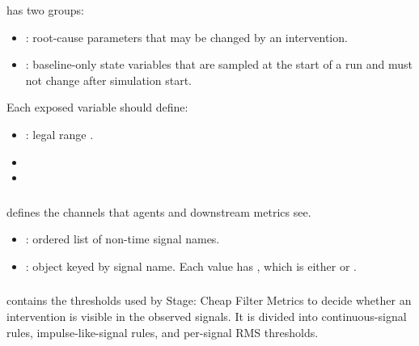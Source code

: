 \documentclass[11pt]{article}
\begin{document}
 has two groups:

\begin{itemize}
\item {}: root-cause parameters that may be changed by an intervention.
\item {}: baseline-only state variables that are sampled at the start of a run and must not change after simulation start.
\end{itemize}

Each exposed variable should define:

\begin{itemize}
\item {}: legal range .
\item \termMinSRDDistance
\item \termMinAbsDist
\end{itemize}

\subsubsection*{}

 defines the channels that agents and downstream metrics see.

\begin{itemize}
\item {}: ordered list of non-time signal names.
\item {}: object keyed by signal name. Each value has , which is either  or .
\end{itemize}

\subsubsection*{}

 contains the thresholds used by Stage: Cheap Filter Metrics to decide whether an intervention is visible in the observed signals.
It is divided into continuous-signal rules, impulse-like-signal rules, and per-signal RMS thresholds.
\end{document}
